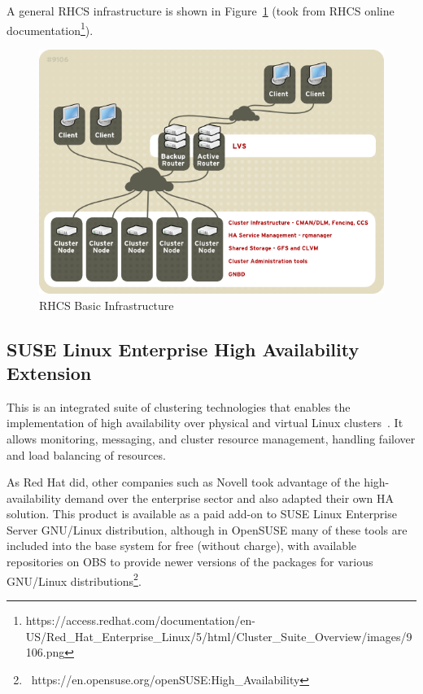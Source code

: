 \documentclass[a4paper, 12pt]{book}
\begin{document}
\noindent A general RHCS infrastructure is shown in Figure~\ref{fig:rhcs} (took from RHCS online documentation\footnote{{\tiny https://access.redhat.com/documentation/en-US/Red\_Hat\_Enterprise\_Linux/5/html/Cluster\_Suite\_Overview/images/9106.png}}).

\FloatBarrier
\begin{figure}[H]
  \centering
  \includegraphics[scale=0.70]{rhcs.png}
  \caption[RHCS Basic Infrastructure]{RHCS Basic Infrastructure}
  \label{fig:rhcs}
\end{figure}


\subsection{SUSE Linux Enterprise High Availability Extension}
\label{subsec:suseha}

This is an integrated suite of clustering technologies that enables the implementation of high availability over physical and virtual Linux clusters~\cite{TandS}. It allows monitoring, messaging, and cluster resource management, handling failover and load balancing of resources.\bigskip

\noindent As Red Hat did, other companies such as Novell took advantage of the high-availability demand over the enterprise sector and also adapted their own HA solution. This product is available as a paid add-on to SUSE Linux Enterprise Server GNU/Linux distribution, although in OpenSUSE many of these tools are included into the base system for free (without charge), with available repositories on OBS to provide newer versions of the packages for various GNU/Linux distributions\footnote{{\tiny\ https://en.opensuse.org/openSUSE:High\_Availability}}.\bigskip
\end{document}

